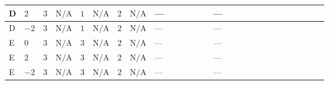 \documentclass[8pt]{article}
\begin{document}
\begin{landscape}
\begin{longtable}{@{}llcccccc >{\raggedright\arraybackslash}p{0.21\linewidth} >{\raggedright\arraybackslash}p{0.21\linewidth} >{\raggedright\arraybackslash}p{0.21\linewidth}@{}}
\midrule
D & $2$ & $3$ & $\text{N/A}$ & $1$ & $\text{N/A}$ & $2$ & $\text{N/A}$ & --- & --- & \scriptsize\adjustbox{max width=\linewidth}{$\begin{gathered} {\lambda_{HS_1}^{(1)}} (6 \operatorname{Tr}\!\left({Y_d}\,\left({Y_d}\right)^{\dagger}\right)+2 \operatorname{Tr}\!\left({Y_e}\,\left({Y_e}\right)^{\dagger}\right)+6 \operatorname{Tr}\!\left({Y_u}\,\left({Y_u}\right)^{\dagger}\right)+4 {\lambda_{S_1}^{(A)}})\end{gathered}$} \\
\midrule
D & $-2$ & $3$ & $\text{N/A}$ & $1$ & $\text{N/A}$ & $2$ & $\text{N/A}$ & --- & --- & \scriptsize\adjustbox{max width=\linewidth}{$\begin{gathered} {\lambda_{HS_1}^{(1)}} (6 \operatorname{Tr}\!\left({Y_d}\,\left({Y_d}\right)^{\dagger}\right)+2 \operatorname{Tr}\!\left({Y_e}\,\left({Y_e}\right)^{\dagger}\right)+6 \operatorname{Tr}\!\left({Y_u}\,\left({Y_u}\right)^{\dagger}\right)+4 {\lambda_{S_1}^{(A)}})\end{gathered}$} \\
\midrule
E & $0$ & $3$ & $\text{N/A}$ & $3$ & $\text{N/A}$ & $2$ & $\text{N/A}$ & --- & --- & \scriptsize\adjustbox{max width=\linewidth}{$\begin{gathered} {\lambda_{HS_1}^{(1)}} (6 \operatorname{Tr}\!\left({Y_d}\,\left({Y_d}\right)^{\dagger}\right)+2 \operatorname{Tr}\!\left({Y_e}\,\left({Y_e}\right)^{\dagger}\right)+6 \operatorname{Tr}\!\left({Y_u}\,\left({Y_u}\right)^{\dagger}\right)+4 {\lambda_{S_1}^{(A)}})\end{gathered}$} \\
\midrule
E & $2$ & $3$ & $\text{N/A}$ & $3$ & $\text{N/A}$ & $2$ & $\text{N/A}$ & --- & --- & \scriptsize\adjustbox{max width=\linewidth}{$\begin{gathered} {\lambda_{HS_1}^{(1)}} (6 \operatorname{Tr}\!\left({Y_d}\,\left({Y_d}\right)^{\dagger}\right)+2 \operatorname{Tr}\!\left({Y_e}\,\left({Y_e}\right)^{\dagger}\right)+6 \operatorname{Tr}\!\left({Y_u}\,\left({Y_u}\right)^{\dagger}\right)+4 {\lambda_{S_1}^{(A)}})\end{gathered}$} \\
\midrule
E & $-2$ & $3$ & $\text{N/A}$ & $3$ & $\text{N/A}$ & $2$ & $\text{N/A}$ & --- & --- & \scriptsize\adjustbox{max width=\linewidth}{$\begin{gathered} {\lambda_{HS_1}^{(1)}} (6 \operatorname{Tr}\!\left({Y_d}\,\left({Y_d}\right)^{\dagger}\right)+2 \operatorname{Tr}\!\left({Y_e}\,\left({Y_e}\right)^{\dagger}\right)+6 \operatorname{Tr}\!\left({Y_u}\,\left({Y_u}\right)^{\dagger}\right)+4 {\lambda_{S_1}^{(A)}})\end{gathered}$} \\

\end{longtable}
\end{landscape}
\end{document}
